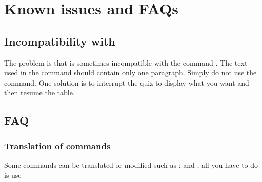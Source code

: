 \section{Known issues and FAQs}

\subsection{Incompatibility with }

 The problem is that  is sometimes incompatible with the command . The text used in the  command should contain only one paragraph. 
  Simply do not use the  command. One solution is to interrupt the quiz to display what you want and then resume the table.
 
 \subsection{FAQ}
  \subsubsection{Translation of commands}
  Some commands can be translated or modified such as :  and , all you have to do is use  
  
\begin{tkzltxexample}[]
\makeatletter
 \renewcommand{\aq@pre}{Pour chacune des questions ci-dessous, une seule des
  r\'eponses propos\'ees est exacte. Vous devez  cocher la r\'eponse exacte
   sans justification.
 Une bonne r\'eponse rapporte \textbf{\cmdAQ@global@bonus\ point}. Une
  mauvaise r\'eponse enl\`eve \textbf{\cmdAQ@global@malus\ point}.  L'absence
  de r\'eponse ne rapporte ni n'enl\`eve aucun point. Si le total des points
  est n\'egatif, la note globale attribu\'ee \`a l'exercice est \textbf{0}.}%
\makeatother 
\end{tkzltxexample}

  
\endinput
